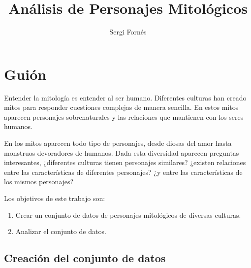 \documentclass[letterpaper,11pt,twocolumn,twoside,]{pinp}
\title{Análisis de Personajes Mitológicos}
\author[]{Sergi Fornés}
\providecommand{\tightlist}{%
  \setlength{\itemsep}{0pt}\setlength{\parskip}{0pt}}
\begin{document}
\verticaladjustment{-2pt}

\maketitle
\thispagestyle{firststyle}



\hypertarget{guiuxf3n}{%
\section{Guión}\label{guiuxf3n}}

Entender la mitología es entender al ser humano. Diferentes culturas han
creado mitos para responder cuestiones complejas de manera sencilla. En
estos mitos aparecen personajes sobrenaturales y las relaciones que
mantienen con los seres humanos.

En los mitos aparecen todo tipo de personajes, desde diosas del amor
hasta monstruos devoradores de humanos. Dada esta diversidad aparecen
preguntas interesantes, ¿diferentes culturas tienen personajes
similares? ¿existen relaciones entre las características de diferentes
personajes? ¿y entre las características de los mismos personajes?

Los objetivos de este trabajo son:

\begin{enumerate}
\def\labelenumi{\arabic{enumi}.}
\tightlist
\item
  Crear un conjunto de datos de personajes mitológicos de diversas
  culturas.
\item
  Analizar el conjunto de datos.
\end{enumerate}

\hypertarget{creaciuxf3n-del-conjunto-de-datos}{%
\subsection{Creación del conjunto de
datos}\label{creaciuxf3n-del-conjunto-de-datos}}
\end{document}

